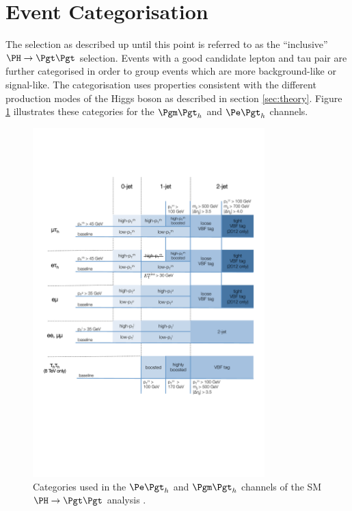 \section{Event Categorisation}
\label{sec:eventcategorisation}

The selection as described up until this point is referred to as the
``inclusive'' $\HToTauTau$ selection. 
Events with a good candidate lepton and tau pair are further categorised in
order to group events which are more background-like or signal-like. The
categorisation uses properties consistent with the different production modes of
the Higgs boson as described in section \ref{sec:theory}. Figure
\ref{fig:smcategories} illustrates these categories for the $\mutau$ and $\etau$
channels.

\begin{figure}[htb]
\begin{center}
    \includegraphics[width=0.8\textwidth]
      {plots/htt-sm/categories_2012.pdf}
\end{center}
\caption{
 Categories used in the $\etau$ and $\mutau$ channels of the \ac{SM}
 $\HToTauTau$ analysis \cite{HIG-13-004}.  
}
\label{fig:smcategories}
\end{figure}

